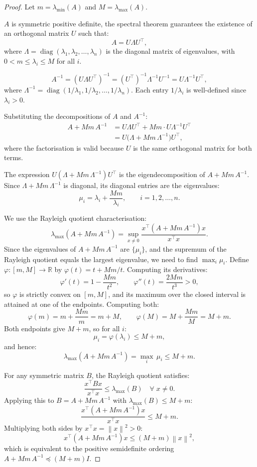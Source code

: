 \documentclass[11pt]{article}
\theoremstyle{definition}
\theoremstyle{plain}
\newcommand{\R}{\mathbb{R}}
\newcommand{\norm}[1]{\left\|#1\right\|}
\begin{document}
\begin{proof}
Let $m = \lambda_{\min}(A)$ and $M = \lambda_{\max}(A)$.

$A$ is symmetric positive definite, the spectral theorem guarantees the existence
of an orthogonal matrix $U$ such that:
\[
  A = U\Lambda U^\top,
\]
where $\Lambda = \operatorname{diag}(\lambda_1, \lambda_2, \ldots, \lambda_n)$
is the diagonal matrix of eigenvalues, with $0 < m \leq \lambda_i \leq M$ for all $i$.

\[
  A^{-1} = (U\Lambda U^\top)^{-1} = (U^\top)^{-1}\Lambda^{-1}U^{-1} = U\Lambda^{-1}U^\top,
\]
where $\Lambda^{-1} = \operatorname{diag}(1/\lambda_1, 1/\lambda_2, \ldots, 1/\lambda_n)$.
Each entry $1/\lambda_i$ is well-defined since $\lambda_i > 0$.


Substituting the decompositions of $A$ and $A^{-1}$:
\begin{align*}
  A + Mm\,A^{-1}
  &= U\Lambda U^\top + Mm\cdot U\Lambda^{-1}U^\top \\
  &= U\bigl(\Lambda + Mm\,\Lambda^{-1}\bigr)U^\top,
\end{align*}
where the factorisation is valid because $U$ is the same orthogonal matrix for both terms.

The expression $U(\Lambda + Mm\,\Lambda^{-1})U^\top$ is the eigendecomposition of $A+Mm\,A^{-1}$.
Since $\Lambda + Mm\,\Lambda^{-1}$ is diagonal, its diagonal entries are the eigenvalues:
\[
  \mu_i = \lambda_i + \frac{Mm}{\lambda_i}, \qquad i = 1, 2, \ldots, n.
\]

We use the Rayleigh quotient characterisation:
\[
  \lambda_{\max}(A + Mm\,A^{-1}) = \sup_{x\neq 0}\frac{x^\top(A+Mm\,A^{-1})x}{x^\top x}.
\]
Since the eigenvalues of $A+Mm\,A^{-1}$ are $\{\mu_i\}$, and the supremum of the
Rayleigh quotient equals the largest eigenvalue, we need to find $\max_i \mu_i$.
Define $\varphi:[m,M]\to\R$ by $\varphi(t)=t+Mm/t$. Computing its derivatives:
\[
  \varphi'(t) = 1 - \frac{Mm}{t^2}, \qquad \varphi''(t) = \frac{2Mm}{t^3} > 0,
\]
so $\varphi$ is strictly convex on $[m,M]$, and its maximum over the closed interval
is attained at one of the endpoints. Computing both:
\[
  \varphi(m) = m + \frac{Mm}{m} = m + M, \qquad
  \varphi(M) = M + \frac{Mm}{M} = M + m.
\]
Both endpoints give $M+m$, so for all $i$:
\[
  \mu_i = \varphi(\lambda_i) \leq M + m,
\]
and hence:
\[
  \lambda_{\max}(A + Mm\,A^{-1}) = \max_i\,\mu_i \leq M + m.
\]

For any symmetric matrix $B$, the Rayleigh quotient satisfies:
\[
  \frac{x^\top Bx}{x^\top x} \leq \lambda_{\max}(B) \quad\forall\;x\neq 0.
\]
Applying this to $B = A + Mm\,A^{-1}$ with $\lambda_{\max}(B)\leq M+m$:
\[
  \frac{x^\top(A + Mm\,A^{-1})x}{x^\top x} \leq M + m.
\]
Multiplying both sides by $x^\top x = \norm{x}^2 > 0$:
\begin{equation}\label{eq:Bbound}
  x^\top(A + Mm\,A^{-1})x \leq (M+m)\norm{x}^2,
\end{equation}
which is equivalent to the positive semidefinite ordering $A + Mm\,A^{-1} \preceq (M+m)I$.



\end{proof}
\end{document}
